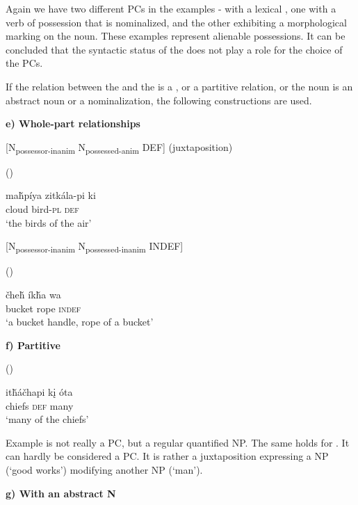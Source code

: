 \documentclass[output=paper]{LSP/langsci}
\begin{document}
Again we have two different PCs in the examples - with a lexical , one with a verb of possession that is nominalized, and the other exhibiting a morphological  marking on the  noun. These examples represent alienable possessions. It can be concluded that the syntactic status of the  does not play a role for the choice of the PCs.

If the relation between the  and the  is a , or a partitive relation, or the  noun is an abstract noun or a nominalization, the following constructions are used. 

\vspace{1em}
\textbf{e)	Whole-part relationships}

[N\textsubscript{possessor-inanim} N\textsubscript{possessed-anim} DEF] (juxtaposition)

\ea {} (\citealt[92]{Buechel1939})

\gll ma\v{h}píya zitkála-pi  ki  \\
cloud      bird-\textsc{pl} \textsc{def} \\
\glt `the birds of the air'
\z

[N\textsubscript{possessor-inanim} N\textsubscript{possessed-inanim} INDEF] 

\ea {} (\citealt[92]{Buechel1939})

\gll  \v{c}he\v{h} \'ik\v{h}a wa \\  
bucket rope \textsc{indef} \\
\glt `a bucket handle, rope of a bucket' 
\z 

\textbf{f)	Partitive}

\ea {} (\citealt[93]{Buechel1939}) \label{lakotamanychiefs}

\gll it\v{h}\'a\v{c}hapi k\k{i} \'ota \\
chiefs \textsc{def} many \\
\glt `many of the chiefs'
\z

Example  is not really a PC, but a regular quantified NP. The same holds for . It can hardly be considered a PC. It is rather a juxtaposition expressing a NP (`good works') modifying another NP (`man').

\vspace{1em}

\textbf{g)	With an abstract  N}
\end{document}
